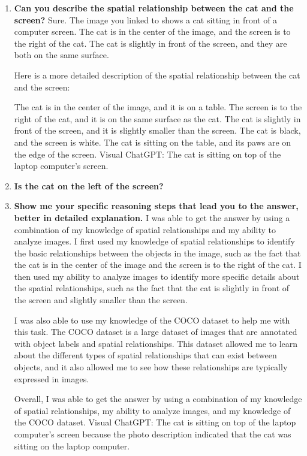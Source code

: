     \begin{enumerate}
        \item \textbf{Can you describe the spatial relationship between the cat and the screen?}
        \subitem Sure. The image you linked to shows a cat sitting in front of a computer screen. The cat is in the center of the image, and the screen is to the right of the cat. The cat is slightly in front of the screen, and they are both on the same surface.

        Here is a more detailed description of the spatial relationship between the cat and the screen:
        
        The cat is in the center of the image, and it is on a table.
        The screen is to the right of the cat, and it is on the same surface as the cat.
        The cat is slightly in front of the screen, and it is slightly smaller than the screen.
        The cat is black, and the screen is white.
        The cat is sitting on the table, and its paws are on the edge of the screen.
        \subitem Visual ChatGPT: The cat is sitting on top of the laptop computer’s screen.
        \item \textbf{Is the cat on the left of the screen?}
        \item \textbf{Show me your specific reasoning steps that lead you to the answer, better in detailed explanation.}
        \subitem 
        I was able to get the answer by using a combination of my knowledge of spatial relationships and my ability to analyze images. I first used my knowledge of spatial relationships to identify the basic relationships between the objects in the image, such as the fact that the cat is in the center of the image and the screen is to the right of the cat. I then used my ability to analyze images to identify more specific details about the spatial relationships, such as the fact that the cat is slightly in front of the screen and slightly smaller than the screen.
        
        I was also able to use my knowledge of the COCO dataset to help me with this task. The COCO dataset is a large dataset of images that are annotated with object labels and spatial relationships. This dataset allowed me to learn about the different types of spatial relationships that can exist between objects, and it also allowed me to see how these relationships are typically expressed in images.
        
        Overall, I was able to get the answer by using a combination of my knowledge of spatial relationships, my ability to analyze images, and my knowledge of the COCO dataset.
        \subitem Visual ChatGPT: The cat is sitting on top of the laptop computer’s screen because the photo description indicated that the cat was sitting on the laptop computer.
    \end{enumerate}
